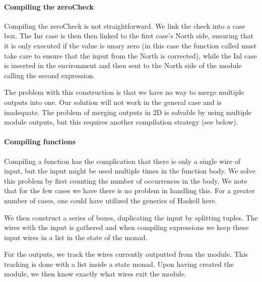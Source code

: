 \paragraph{Compiling the zeroCheck}
\label{sec:compiling-zerochk}

Compiling the zeroCheck is not straightforward. We link the check
into a case box. The Inr case is then then linked to the first case's
North side, ensuring that it is only executed if the value is unary
zero (in this case the function called must take care to ensure that
the input from the North is corrected), while the Inl case is inserted
in the environment and then sent to the North side of the module
calling the second expression.

The problem with this construction is that we have no way to merge
multiple outputs into one. Our solution will not work in the general
case and is inadequate. The problem of merging outputs in 2D is
solvable by using multiple module outputs, but this requires another
compilation strategy (see below).

\paragraph{Compiling functions}
\label{sec:compiling-functions}

Compiling a function has the complication that there is only a single
wire of input, but the input might be used multiple times in the
function body. We solve this problem by first counting the number of
occurrences in the body. We note that for the few cases we have there
is no problem in handling this. For a greater number of cases, one could
have utilized the generics of Haskell here.

We then construct a series of boxes, duplicating the input by
splitting tuples. The wires with the input is gathered and when
compiling expressions we keep these input wires in a list in the state
of the monad.

For the outputs, we track the wires currently outputted from the
module. This tracking is done with a list inside a state monad. Upon
having created the module, we then know exactly what wires exit the
module.


